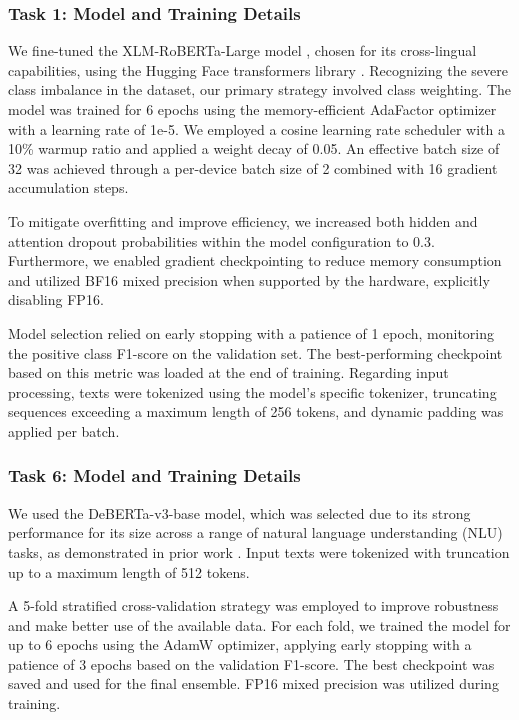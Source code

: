 \documentclass[letterpaper]{article} %
\begin{document}
\subsubsection{Task 1: Model and Training Details}

We fine-tuned the XLM-RoBERTa-Large model \cite{conneau2019}, chosen for its cross-lingual capabilities, using the Hugging Face transformers library \cite{wolf-etal-2020-transformers}. Recognizing the severe class imbalance in the dataset, our primary strategy involved class weighting.
The model was trained for 6 epochs using the memory-efficient AdaFactor optimizer with a learning rate of 1e-5. We employed a cosine learning rate scheduler with a 10\% warmup ratio and applied a weight decay of 0.05. An effective batch size of 32 was achieved through a per-device batch size of 2 combined with 16 gradient accumulation steps.

To mitigate overfitting and improve efficiency, we increased both hidden and attention dropout probabilities within the model configuration to 0.3. Furthermore, we enabled gradient checkpointing to reduce memory consumption and utilized BF16 mixed precision when supported by the hardware, explicitly disabling FP16.

Model selection relied on early stopping with a patience of 1 epoch, monitoring the positive class F1-score on the validation set. The best-performing checkpoint based on this metric was loaded at the end of training. Regarding input processing, texts were tokenized using the model's specific tokenizer, truncating sequences exceeding a maximum length of 256 tokens, and dynamic padding was applied per batch.


\subsubsection{Task 6: Model and Training Details}

We used the DeBERTa-v3-base model, which was selected due to its strong performance for its size across a range of natural language understanding (NLU) tasks, as demonstrated in prior work \cite{he2021debertav3, he2021deberta}. Input texts were tokenized with truncation up to a maximum length of 512 tokens.

A 5-fold stratified cross-validation strategy was employed to improve robustness and make better use of the available data. 
For each fold, we trained the model for up to 6 epochs using the AdamW optimizer, applying early stopping with a patience of 3 epochs based on the validation F1-score. The best checkpoint was saved and used for the final ensemble. FP16 mixed precision was utilized during training.
\end{document}

